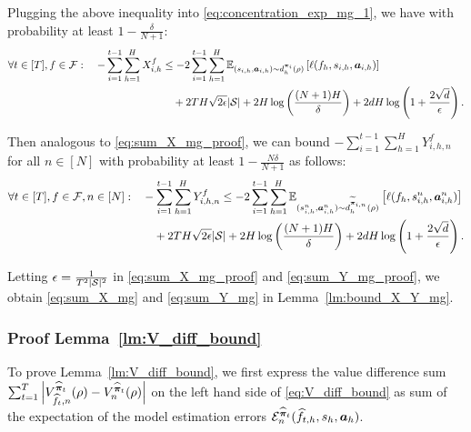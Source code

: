 Plugging the above inequality into \eqref{eq:concentration_exp_mg_1}, we have with probability at least $1-\frac{\delta}{N+1}$:
\begin{align}\label{eq:sum_X_mg_proof}
    \forall t\in[T],f\in{\mathcal{F}}:\quad -\sum_{i=1}^{t-1}\sum_{h=1}^H X_{i,h}^f &\leq -2\sum_{i=1}^{t-1}\sum_{h=1}^H \mathbb{E}_{(s_{i,h},{\bm{a}}_{i,h})\sim d_h^{{\bm{\pi}}_i}(\rho)}\left[\ell(f_h,s_{i,h},{\bm{a}}_{i,h})\right] \notag\\
    &\quad+ 2TH\sqrt{2\epsilon}|{\mathcal{S}}| + 2H\log\left(\frac{(N+1)H}{\delta}\right) + 2dH\log\left(1+\frac{2\sqrt{d}}{\epsilon}\right).
\end{align}

 
Then analogous to \eqref{eq:sum_X_mg_proof}, we can bound $-\sum_{i=1}^{t-1}\sum_{h=1}^H Y_{i,h,n}^f$ for all $n\in[N]$ with probability at least $1-\frac{N\delta}{N+1}$ as follows:
\begin{align}\label{eq:sum_Y_mg_proof}
    \forall t\in[T],f\in{\mathcal{F}}, n\in [N] :\quad & -\sum_{i=1}^{t-1}\sum_{h=1}^H Y_{i,h,n}^f  \leq -2\sum_{i=1}^{t-1}\sum_{h=1}^H \mathbb{E}_{(s_{i,h}^n,{\bm{a}}_{i,h}^n)\sim d_h^{\widetilde{{\bm{\pi}}}_{i,n}}(\rho)}\left[\ell(f_h,s_{i,h}^n,{\bm{a}}_{i,h}^n)\right] \notag\\
    &\quad+ 2TH\sqrt{2\epsilon}|{\mathcal{S}}| + 2H\log\left(\frac{(N+1)H}{\delta}\right) + 2dH\log\left(1+\frac{2\sqrt{d}}{\epsilon}\right).
\end{align}

Letting $\epsilon=\frac{1}{T^2|{\mathcal{S}}|^2}$ in \eqref{eq:sum_X_mg_proof} and \eqref{eq:sum_Y_mg_proof}, we obtain \eqref{eq:sum_X_mg} and \eqref{eq:sum_Y_mg} in Lemma~\ref{lm:bound_X_Y_mg}.



\subsubsection{Proof Lemma~\ref{lm:V_diff_bound}}\label{app:proof_V_diff_bound}
 

To prove Lemma~\ref{lm:V_diff_bound}, we first express the value difference sum $\sum_{t=1}^T \left|V_{\widehat{f}_{t},n}^{\widehat{{\bm{\pi}}}_{t}}(\rho)-V_{n}^{\widehat{{\bm{\pi}}}_{t}}(\rho)\right|$ on the left hand side of \eqref{eq:V_diff_bound} 
as sum of the expectation of the model estimation errors ${\mathcal{E}}_n^{\widehat{{\bm{\pi}}}_{t}}(\widehat{f}_{t,h},s_h,{\bm{a}}_h)$.

